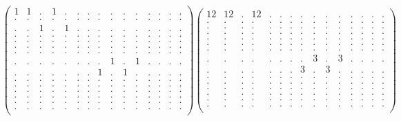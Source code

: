 \documentclass[12pt,a4paper]{amsart}
\begin{document}
\begin{align*}
\left(\begin{array}{rrrrrrrrrrrrrrr}%
1&1&.&1&.&.&.&.&.&.&.&.&.&.&.\\%
.&.&.&.&.&.&.&.&.&.&.&.&.&.&.\\%
.&.&1&.&1&.&.&.&.&.&.&.&.&.&.\\%
.&.&.&.&.&.&.&.&.&.&.&.&.&.&.\\%
.&.&.&.&.&.&.&.&.&.&.&.&.&.&.\\%
.&.&.&.&.&.&.&.&.&.&.&.&.&.&.\\%
.&.&.&.&.&.&.&.&.&.&.&.&.&.&.\\%
.&.&.&.&.&.&.&.&1&.&1&.&.&.&.\\%
.&.&.&.&.&.&.&1&.&1&.&.&.&.&.\\%
.&.&.&.&.&.&.&.&.&.&.&.&.&.&.\\%
.&.&.&.&.&.&.&.&.&.&.&.&.&.&.\\%
.&.&.&.&.&.&.&.&.&.&.&.&.&.&.\\%
.&.&.&.&.&.&.&.&.&.&.&.&.&.&.\\%
.&.&.&.&.&.&.&.&.&.&.&.&.&.&.\\%
.&.&.&.&.&.&.&.&.&.&.&.&.&.&.\\%
\end{array}\right)%
\left(\begin{array}{rrrrrrrrrrrrrrr}%
12&12&.&12&.&.&.&.&.&.&.&.&.&.&.\\%
.&.&.&.&.&.&.&.&.&.&.&.&.&.&.\\%
.&.&.&.&.&.&.&.&.&.&.&.&.&.&.\\%
.&.&.&.&.&.&.&.&.&.&.&.&.&.&.\\%
.&.&.&.&.&.&.&.&.&.&.&.&.&.&.\\%
.&.&.&.&.&.&.&.&.&.&.&.&.&.&.\\%
.&.&.&.&.&.&.&.&.&.&.&.&.&.&.\\%
.&.&.&.&.&.&.&.&3&.&3&.&.&.&.\\%
.&.&.&.&.&.&.&3&.&3&.&.&.&.&.\\%
.&.&.&.&.&.&.&.&.&.&.&.&.&.&.\\%
.&.&.&.&.&.&.&.&.&.&.&.&.&.&.\\%
.&.&.&.&.&.&.&.&.&.&.&.&.&.&.\\%
.&.&.&.&.&.&.&.&.&.&.&.&.&.&.\\%
.&.&.&.&.&.&.&.&.&.&.&.&.&.&.\\%
.&.&.&.&.&.&.&.&.&.&.&.&.&.&.\\%
\end{array}\right)%
\end{align*}
\end{document}
